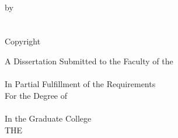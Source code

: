 \documentclass[
12pt, %
english, %
doublespacing, %
nolistspacing, %
liststotoc, %
headsepline, %
chapterinoneline, %
openany, %
]{DoctoralThesis}\usepackage[]{graphicx}\usepackage[]{color}
\begin{document}
\begin{titlepage}
\begin{singlespacing} %
\begin{center}

\vfill

\MakeUppercase{\ttitle}\\ %
\vspace{0.4in}
by\\ \vspace{0.4in}
{\authorname}\\ %
\vspace{0.6in}
\HRule \\[0.1cm] %
Copyright \textcopyright\space\authorname\space{\the\year}\\ %

\vspace{0.4in}

A Dissertation Submitted to the Faculty of the\\ %
\vspace{0.4in}
\MakeUppercase{\deptname} \\  %
\vspace{0.4in}
In Partial Fulfillment of the Requirements \\ \medskip %
For the Degree of \\  %
\vspace{0.4in}
\MakeUppercase{\degreename} \\ %
\vspace{0.4in} 
In the Graduate College \\  %
\vspace{0.4in}
\MakeUppercase{The \univname} \\ %
\vspace{0.6in}
{\the\year}\\[4cm] %

\vfill
\end{center}
\end{singlespacing}%
\end{titlepage}
\end{document}
